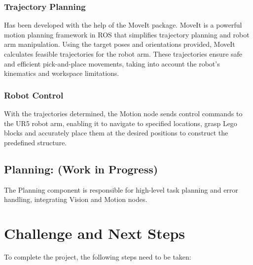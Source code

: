\documentclass{article}
\begin{document}
	\subsubsection{Trajectory Planning}
	Has been developed with the help of the MoveIt package. MoveIt is a powerful motion planning framework in ROS that simplifies trajectory planning and robot arm manipulation. Using the target poses and orientations provided, MoveIt calculates feasible trajectories for the robot arm. These trajectories ensure safe and efficient pick-and-place movements, taking into account the robot's kinematics and workspace limitations.
	
	\subsubsection{Robot Control}
	With the trajectories determined, the Motion node sends control commands to the UR5 robot arm, enabling it to navigate to specified locations, grasp Lego blocks and accurately place them at the desired positions to construct the predefined structure.
	
	\subsection{Planning: (Work in Progress)}
	The Planning component is responsible for high-level task planning and error handling, integrating Vision and Motion nodes.
	
	\section{Challenge and Next Steps}
	To complete the project, the following steps need to be taken:
	
\end{document}
